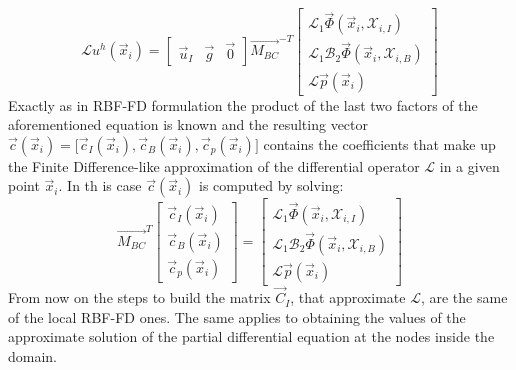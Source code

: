 \begin{equation}
	\label{eqn:FD_like_discretization_of_L_middle_step_RBF-HFD}
	\mathcal{L} u^h(\vec{x}_i) = 
	\begin{bmatrix}
		\vec{u}_I  &  \vec{g}  &  \vec{0}
	\end{bmatrix}
	\vec{M_{BC}}^{-T}
	\begin{bmatrix}
		\mathcal{L}_1 \vec{\Phi}(\vec{x}_i, \mathcal{X}_{i,I})  			  \\
		\mathcal{L}_1 \mathcal{B}_2 \vec{\Phi}(\vec{x}_i, \mathcal{X}_{i,B})  \\
		\mathcal{L} \vec{p}(\vec{x}_i)
	\end{bmatrix}	
\end{equation}
Exactly as in RBF-FD formulation the product of the last two factors of the aforementioned equation is known and the resulting vector $\vec{c}(\vec{x}_i) = \bigl[ \vec{c}_I(\vec{x}_i), \vec{c}_B(\vec{x}_i), \vec{c}_p(\vec{x}_i) \bigr]$ contains the coefficients that make up the Finite Difference-like approximation of the differential operator $ \mathcal{L}$ in a given point $\vec{x}_i$. In th is case $\vec{c}(\vec{x}_i) $ is computed by solving:
\begin{equation}
	\label{eqn:row_of_C_system_in_RBF-HFD}
	\vec{M_{BC}}^T
	\begin{bmatrix}
		\vec{c}_I(\vec{x}_i)  \\
		\vec{c}_B(\vec{x}_i)  \\
		\vec{c}_p(\vec{x}_i)
	\end{bmatrix} = 
	\begin{bmatrix}
		\mathcal{L}_1 \vec{\Phi}(\vec{x}_i, \mathcal{X}_{i,I})  			  \\
		\mathcal{L}_1 \mathcal{B}_2 \vec{\Phi}(\vec{x}_i, \mathcal{X}_{i,B})  \\
		\mathcal{L} \vec{p}(\vec{x}_i)
	\end{bmatrix}
\end{equation}
From now on the steps to build the matrix $\vec{C}_I$, that approximate $\mathcal{L}$, are the same of the local RBF-FD ones. The same applies to obtaining the values of the approximate solution of the partial differential equation at the nodes inside the domain.









